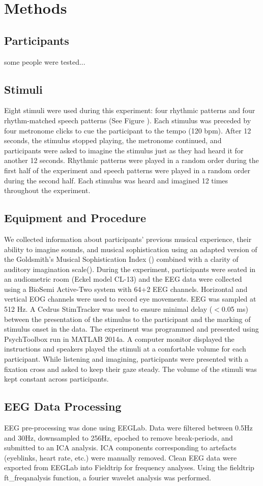 \section*{Methods}
\subsection*{Participants}
some people were tested...
\subsection*{Stimuli}
Eight stimuli were used during this experiment: four rhythmic patterns and four rhythm-matched speech patterns (See Figure  ). 
Each stimulus was preceded by four metronome clicks to cue the participant to the tempo (120 bpm). 
After 12 seconds, the stimulus stopped playing, the metronome continued, and participants were asked to imagine the stimulus just as they had heard it for another 12 seconds. 
Rhythmic patterns were played in a random order during the first half of the experiment and speech patterns were played in a random order during the second half. 
Each stimulus was heard and imagined 12 times throughout the experiment. 
\subsection*{Equipment and Procedure}
We collected information about participants' previous musical experience, their ability to imagine sounds, and musical sophistication using an adapted version of the Goldsmith's Musical Sophistication Index () combined with a clarity of auditory imagination scale(). 
During the experiment, participants were seated in an audiometric room (Eckel model CL-13) and the EEG data were collected using a BioSemi Active-Two system with 64+2 EEG channels. 
Horizontal and vertical EOG channels were used to record eye movements. EEG was sampled at 512 Hz. 
A Cedrus StimTracker was used to ensure minimal delay ($<$0.05 ms) between the presentation of the stimulus to the participant and the marking of stimulus onset in the data. 
The experiment was programmed and presented using PsychToolbox run in MATLAB 2014a. A computer monitor displayed the instructions and speakers played the stimuli at a comfortable volume for each participant. 
While listening and imagining, participants were presented with a fixation cross and asked to keep their gaze steady.
The volume of the stimuli was kept constant across participants.
\subsection*{EEG Data Processing}
EEG pre-processing was done using EEGLab. 
Data were filtered between 0.5Hz and 30Hz, downsampled to 256Hz, epoched to remove break-periods, and submitted to an ICA analysis.
ICA components corresponding to artefacts (eyeblinks, heart rate, etc.) were manually removed.
Clean EEG data were exported from EEGLab into Fieldtrip for frequency analyses.
Using the fieldtrip ft\_freqanalysis function, a fourier wavelet analysis was performed. 